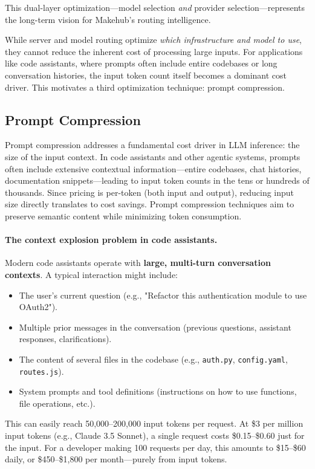 \documentclass[english]{article}
\begin{document}
This dual-layer optimization—model selection \emph{and} provider selection—represents the long-term vision for Makehub's routing intelligence.

While server and model routing optimize \emph{which infrastructure and model to use}, they cannot reduce the inherent cost of processing large inputs. For applications like code assistants, where prompts often include entire codebases or long conversation histories, the input token count itself becomes a dominant cost driver. This motivates a third optimization technique: prompt compression.

\subsection{Prompt Compression}

Prompt compression addresses a fundamental cost driver in LLM inference: the size of the input context. In code assistants and other agentic systems, prompts often include extensive contextual information—entire codebases, chat histories, documentation snippets—leading to input token counts in the tens or hundreds of thousands. Since pricing is per-token (both input and output), reducing input size directly translates to cost savings. Prompt compression techniques aim to preserve semantic content while minimizing token consumption.

\paragraph{The context explosion problem in code assistants.}

Modern code assistants operate with \textbf{large, multi-turn conversation contexts}. A typical interaction might include:
\begin{itemize}
    \item The user's current question (e.g., "Refactor this authentication module to use OAuth2").
    \item Multiple prior messages in the conversation (previous questions, assistant responses, clarifications).
    \item The content of several files in the codebase (e.g., \texttt{auth.py}, \texttt{config.yaml}, \texttt{routes.js}).
    \item System prompts and tool definitions (instructions on how to use functions, file operations, etc.).
\end{itemize}

This can easily reach 50,000--200,000 input tokens per request. At \$3 per million input tokens (e.g., Claude 3.5 Sonnet), a single request costs \$0.15--\$0.60 just for the input. For a developer making 100 requests per day, this amounts to \$15--\$60 daily, or \$450--\$1,800 per month—purely from input tokens.
\end{document}
